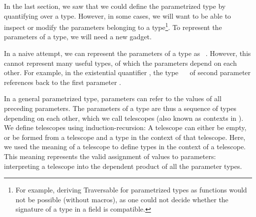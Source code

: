 
In the last section, we saw that we could define the parametrized type  by quantifying over a type. However, in some cases, we will want to be able to inspect or modify the parameters belonging to a type\footnote{For example, deriving Traversable for parametrized types as functions would not be possible (without macros), as one could not decide whether the signature of a type in a field is compatible.}. To represent the parameters of a type, we will need a new gadget.

In a naive attempt, we can represent the parameters of a type as \ . However, this cannot represent many useful types, of which the parameters depend on each other. For example, in the existential quantifier , the type \ \  of second parameter  references back to the first parameter .


In a general parametrized type, parameters can refer to the values of all preceding parameters. The parameters of a type are thus a sequence of types depending on each other, which we call telescopes \cite{practgen, sijsling, telescopes} (also known as contexts in ). We define telescopes using induction-recursion:
A telescope can either be empty, or be formed from a telescope and a type in the context of that telescope. Here, we used the meaning of a telescope  to define types in the context of a telescope. This meaning represents the valid assignment of values to parameters:
interpreting a telescope into the dependent product of all the parameter types.


